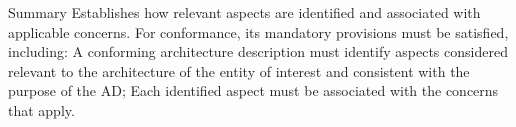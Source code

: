 \documentclass[10pt,letterpaper]{article}
\begin{document}
\begin{CornellSummaryBox}{Summary}
Establishes how relevant aspects are identified and associated with applicable concerns. For conformance, its mandatory provisions must be satisfied, including: A conforming architecture description must identify aspects considered relevant to the architecture of the entity of interest and consistent with the purpose of the AD; Each identified aspect must be associated with the concerns that apply.
\end{CornellSummaryBox}
\end{document}
